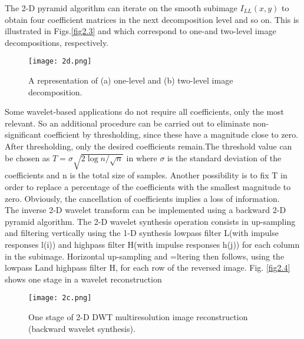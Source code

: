 The 2-D pyramid algorithm can iterate on the smooth subimage 
\({I}_{LL}\left(x,y \right)\) to obtain four coefficient matrices in the next decomposition level and so on. This is illustrated in Figs.\ref{fig2.3} and  which correspond to one-and two-level image decompositions, respectively.  \\ 

\begin{figure}[h]
  \centering
  \texttt{[image: 2d.png]}
  \label{fig2}
  \caption{ A representation of (a) one-level and (b) two-level image
decomposition.}
\end{figure}

Some wavelet-based applications do not require all coefficients, only the most relevant. So an additional procedure can be carried out to eliminate non-significant coefficient by thresholding, since these have a magnitude close to zero. After thresholding, only the desired coefficients remain.The threshold value can be chosen as \(T=\sigma\sqrt{2\log n/ \sqrt{n}}  \) in  where \(\sigma\)  is the standard deviation of the coefficients and n is the total size of samples. Another possibility is to fix T in order to replace a percentage of the coefficients with the
smallest magnitude to zero. Obviously, the cancellation of coefficients implies a loss of information. \\

The inverse 2-D wavelet transform can be implemented using a backward 2-D pyramid algorithm. The 2-D wavelet synthesis operation consists in up-sampling and filtering vertically using the 1-D synthesis lowpass filter
L(with impulse responses l(i)) and highpass filter H(with impulse
responses  h(j)) for each column in the subimage. Horizontal up-sampling and =ltering then follows, using the lowpass  Land highpass filter H, for each row of the reversed image. Fig. \ref{fig2.4} shows one stage in a wavelet reconstruction


\begin{figure}[h]
  \centering
  \texttt{[image: 2c.png]}
  \label{fig2}
  \caption{One stage of 2-D DWT multiresolution image reconstruction
(backward wavelet synthesis).}
\end{figure}

